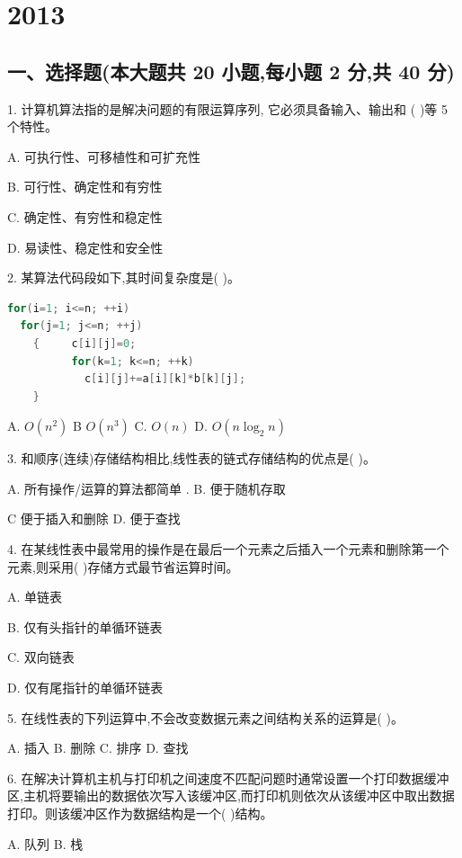 \chapter{2013}

\section*{一、选择题(本大题共 20 小题,每小题 2 分,共 40 分)}

1. 计算机算法指的是解决问题的有限运算序列, 它必须具备输入、输出和 (   )等 5 个特性。

A. 可执行性、可移植性和可扩充性

B. 可行性、确定性和有穷性

C. 确定性、有穷性和稳定性

D. 易读性、稳定性和安全性

2. 某算法代码段如下,其时间复杂度是(   )。

\begin{lstlisting}[language=C, basicstyle=\ttfamily]
for(i=1; i<=n; ++i)
  for(j=1; j<=n; ++j)
    {     c[i][j]=0;
          for(k=1; k<=n; ++k)
            c[i][j]+=a[i][k]*b[k][j];
    }
\end{lstlisting}

A. \(O\left( {n}^{2}\right)\) B \(O\left( {n}^{3}\right)\) C. \(O\left( n\right)\) D. \(O\left( {n{\log }_{2}n}\right)\)

3. 和顺序(连续)存储结构相比,线性表的链式存储结构的优点是(   )。

A. 所有操作/运算的算法都简单 . B. 便于随机存取

C 便于插入和删除 D. 便于查找

4. 在某线性表中最常用的操作是在最后一个元素之后插入一个元素和删除第一个元素,则采用(   )存储方式最节省运算时间。

A. 单链表 

B. 仅有头指针的单循环链表

C. 双向链表 

D. 仅有尾指针的单循环链表

5. 在线性表的下列运算中,不会改变数据元素之间结构关系的运算是(   )。

A. 插入 B. 删除 C. 排序 D. 查找

6. 在解决计算机主机与打印机之间速度不匹配问题时通常设置一个打印数据缓冲区,主机将要输出的数据依次写入该缓冲区,而打印机则依次从该缓冲区中取出数据打印。则该缓冲区作为数据结构是一个(   )结构。

A. 队列 B. 栈

